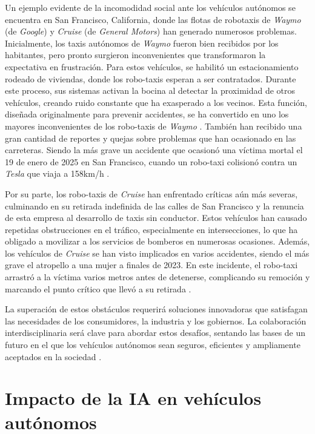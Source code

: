 Un ejemplo evidente de la incomodidad social ante los vehículos autónomos se encuentra en San Francisco, California, donde las flotas de robotaxis de \textit{Waymo} (de \textit{Google}) y \textit{Cruise} (de \textit{General Motors}) han generado numerosos problemas. Inicialmente, los taxis autónomos de \textit{Waymo} fueron bien recibidos por los habitantes, pero pronto surgieron inconvenientes que transformaron la expectativa en frustración. Para estos vehículos, se habilitó un estacionamiento rodeado de viviendas, donde los robo-taxis esperan a ser contratados. Durante este proceso, sus sistemas activan la bocina al detectar la proximidad de otros vehículos, creando ruido constante que ha exasperado a los vecinos. Esta función, diseñada originalmente para prevenir accidentes, se ha convertido en uno los mayores inconvenientes de los robo-taxis de \textit{Waymo} \cite{robotaxis-waymo}. También han recibido una gran cantidad de reportes y quejas sobre problemas que han ocasionado en las carreteras. Siendo la más grave un accidente que ocasionó una víctima mortal el 19 de enero de 2025 en San Francisco, cuando un robo-taxi colisionó contra un \textit{Tesla} que viaja a 158km/h \cite{waymo-wiki}.

Por su parte, los robo-taxis de \textit{Cruise} han enfrentado críticas aún más severas, culminando en su retirada indefinida de las calles de San Francisco y la renuncia de esta empresa al desarrollo de taxis sin conductor. Estos vehículos han causado repetidas obstrucciones en el tráfico, especialmente en intersecciones, lo que ha obligado a movilizar a los servicios de bomberos en numerosas ocasiones. Además, los vehículos de \textit{Cruise} se han visto implicados en varios accidentes, siendo el más grave el atropello a una mujer a finales de 2023. En este incidente, el robo-taxi arrastró a la víctima varios metros antes de detenerse, complicando su remoción y marcando el punto crítico que llevó a su retirada \cite{robotaxis-cruise}.

La superación de estos obstáculos requerirá soluciones innovadoras que satisfagan las necesidades de los consumidores, la industria y los gobiernos. La colaboración interdisciplinaria será clave para abordar estos desafíos, sentando las bases de un futuro en el que los vehículos autónomos sean seguros, eficientes y ampliamente aceptados en la sociedad \cite{challenges-autonomous}.

\section{Impacto de la IA en vehículos autónomos}
\label{sec:ia-intro}

